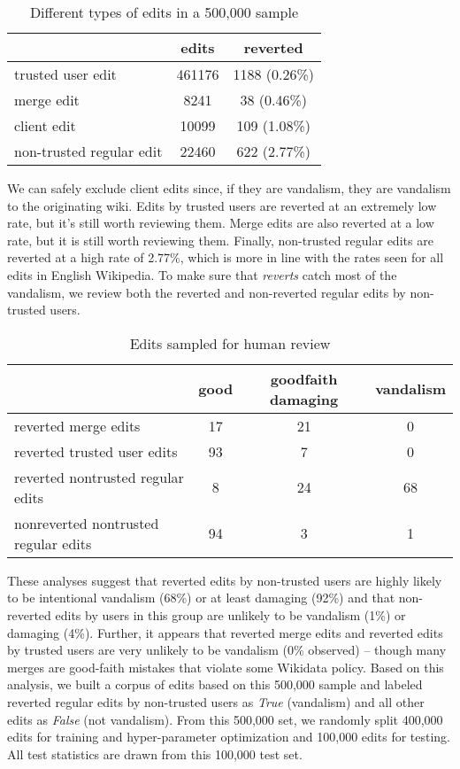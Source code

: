 \documentclass{sig-alternate}
\begin{document}
\begin{table}
\centering
\caption{Different types of edits in a 500,000 sample}
\begin{tabular}{l|c|c} \hline
& edits & reverted \\ \hline
trusted user edit & 461176 & 1188 (0.26\%)\\ \hline
merge edit & 8241 & 38 (0.46\%) \\ \hline
client edit & 10099 & 109 (1.08\%) \\ \hline
non-trusted regular edit & 22460 & 622 (2.77\%)
\end{tabular}
\end{table}

We can safely exclude client edits since, if they are vandalism, they are vandalism to the originating wiki. Edits by trusted users are reverted at an extremely low rate, but it's still worth reviewing them. Merge edits are also reverted at a low rate, but it is still worth reviewing them. Finally, non-trusted regular edits are reverted at a high rate of 2.77\%, which is more in line with the rates seen for all edits in English Wikipedia\cite{potthast:crowdsourcing}.  To make sure that \textit{reverts} catch most of the vandalism, we review both the reverted and non-reverted regular edits by non-trusted users.

\begin{table*}
\centering
\caption{Edits sampled for human review}
\begin{tabular}{l|c|c|c} \hline
& good & good\-faith damaging & vandalism \\ \hline
reverted merge edits & 17 & 21 & 0 \\ \hline
reverted trusted user edits & 93 & 7 & 0 \\ \hline
reverted non\-trusted regular edits & 8 & 24 & 68 \\ \hline
non\-reverted non\-trusted regular edits & 94 & 3 & 1
\end{tabular}
\end{table*}
These analyses suggest that reverted edits by non-trusted users are highly likely to be intentional vandalism (68\%) or at least damaging (92\%) and that non-reverted edits by users in this group are unlikely to be vandalism (1\%) or damaging (4\%).  Further, it appears that reverted merge edits and reverted edits by trusted users are very unlikely to be vandalism (0\% observed) -- though many merges are good-faith mistakes that violate some Wikidata policy. Based on this analysis, we built a corpus of edits based on this 500,000 sample and labeled reverted regular edits by non-trusted users as \textit{True} (vandalism) and all other edits as \textit{False} (not vandalism). From this 500,000 set, we randomly split 400,000 edits for training and hyper-parameter optimization and 100,000 edits for testing. All test statistics are drawn from this 100,000 test set.
\end{document}
